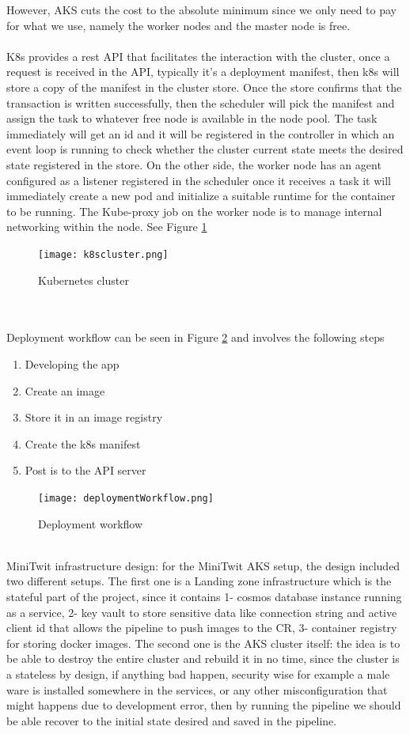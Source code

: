 However, AKS cuts the cost to the absolute minimum since we only need to pay for what we use, namely the worker nodes and the master node is free.
\\\\
K8s provides a rest API that facilitates the interaction with the cluster, once a request is received in the API, typically it's a deployment manifest, then k8s will store a copy of the manifest in the cluster store. Once the store confirms that the transaction is written successfully, then the scheduler will pick the manifest and assign the task to whatever free node is available in the node pool. The task immediately will get an id and it will be registered in the controller in which an event loop is running to check whether the cluster current state meets the desired state registered in the store. On the other side, the worker node has an agent configured as a listener registered in the scheduler once it receives a task it will immediately create a new pod and initialize a suitable runtime for the container to be running. The Kube-proxy job on the worker node is to manage internal networking within the node. See Figure \ref{fig:k8scluster}
\begin{figure}[h]
    \centering
    \texttt{[image: k8scluster.png]}
    \caption{Kubernetes cluster\cite{https://kubernetes.io/KubernetesKubernetes}}
    \label{fig:k8scluster}
\end{figure}
\\\\
Deployment workflow can be seen in Figure \ref{fig:deploymentWorkflow} and involves the following steps
\begin{enumerate}
    \item Developing the app
    \item Create an image
    \item Store it in an image registry
    \item Create the k8s manifest
    \item Post is to the API server
\end{enumerate} 
\begin{figure}[h]
    \centering
    \texttt{[image: deploymentWorkflow.png]}
    \caption{Deployment workflow \cite{https://kubernetes.io/KubernetesKubernetes}}
    \label{fig:deploymentWorkflow}
\end{figure}
\\
MiniTwit infrastructure design: for the MiniTwit AKS setup, the design included two different setups. The first one is a Landing zone infrastructure which is the stateful part of the project, since it contains 1- cosmos database instance running as a service, 2- key vault to store sensitive data like connection string and active client id that allows the pipeline to push images to the CR, 3- container registry for storing docker images. The second one is the AKS cluster itself: the idea is to be able to destroy the entire cluster and rebuild it in no time, since the cluster is a stateless by design, if anything bad happen, security wise for example a male ware is installed somewhere in the services, or any other misconfiguration that might happens due to development error, then by running the pipeline we should be able recover to the initial state desired and saved in the pipeline. 

